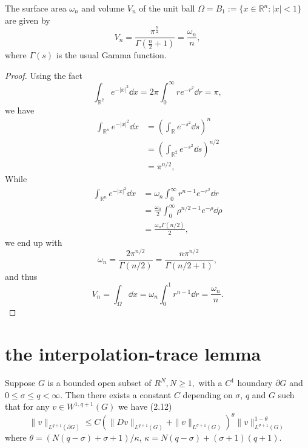 \begin{lemma}
	The surface area $\omega_n$ and volume $V_n$ of the unit ball $\Omega = B_1 := \{x\in\mathbb{R}^n: |x|<1\}$ are given by
	\[
		V_n=\frac{\pi^{\frac{n}{2}}}{\Gamma\left(\frac{n}{2}+1\right)} = \frac{\omega_n}{n},
	\]
	where $\Gamma(s)$ is the usual Gamma function.
\end{lemma}
\begin{proof}
	Using the fact
	\begin{equation*}
		\int_{\mathbb{R}^2}e^{-|x|^2}\dd x 
			= 2\pi\int_0^\infty re^{-r^2}\dd r
			= \pi,
	\end{equation*}
	we have 
	\begin{align*}
		\int_{\mathbb{R}^n}e^{-|x|^2}\dd x
			&= \left(\int_{\mathbb{R}}e^{-s^2}\dd s\right)^n\\
			&= \left(\int_{\mathbb{R}^2}e^{-s^2}\dd s\right)^{n/2}\\
			&= \pi^{n/2},
	\end{align*}
	While 
	\begin{align*}
		\int_{\mathbb{R}^n}e^{-|x|^2}\dd x
			&= \omega_n\int_0^\infty r^{n-1}e^{-r^2}\dd r\\
			&= \frac{\omega_n}2\int_0^\infty \rho^{n/2-1}e^{-\rho}\dd\rho\\
			&= \frac{\omega_n\Gamma(n/2)}{2},
	\end{align*}
	we end up with
	\[
		\omega_n = \frac{2\pi^{n/2}}{\Gamma(n/2)} = \frac{n\pi^{n/2}}{\Gamma(n/2+1)},
	\]
	and thus
	\[
		V_n = \int_{\Omega}\dd x = \omega_n\int_0^1r^{n-1}\dd r = \frac{\omega_n}{n}.
	\]
\end{proof}

\section{the interpolation-trace lemma}
\begin{lemma}
	\cite{Diaz1985}
	\label{the interpolation-trace lemma}
	Suppose $G$ is a bounded open subset of $R^{N}, N \geq 1,$ with a $C^{1}$ houndary $\partial G$ and $0 \leq \sigma \leq q<\infty .$ Then there exists a constant $C$ depending on $\sigma$, $q$ and $G$ such that for any $v \in W^{1, q+1}(G)$ we have
(2.12)
\begin{equation*}
	\|v\|_{L^{q+1}(\partial G)} \leq C\left(\|D v\|_{L^{q+1}(G)}+\|v\|_{L^{\sigma+1}(G)}\right)^{\theta}\|v\|_{L^{\sigma+1}(G)}^{1-\theta}
\end{equation*}
where $\theta=(N(q-\sigma)+\sigma+1) / \kappa$, \(\kappa=N(q-\sigma)+(\sigma+1)(q+1)\).

\end{lemma}

